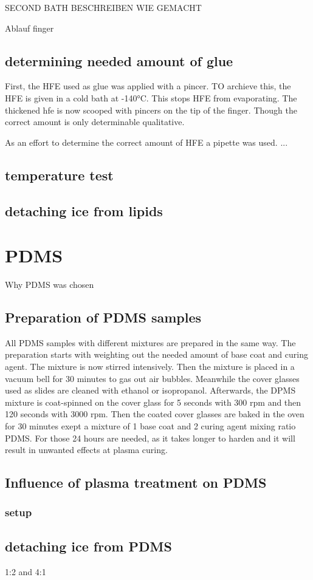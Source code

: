 SECOND BATH BESCHREIBEN WIE GEMACHT



Ablauf finger



\subsection{determining needed amount of glue}

First, the HFE used as glue was applied with a pincer. TO archieve this, the HFE is given in a cold bath at -140°C. This stops HFE from evaporating. The thickened hfe is now scooped with pincers on the tip of the finger. Though the correct amount is only determinable qualitative.

As an effort to determine the correct amount of HFE a pipette was used. ...



\subsection{temperature test}

\subsection{detaching ice from lipids}

\section{PDMS}

Why PDMS was chosen

\subsection{Preparation of PDMS samples}

All PDMS samples with different mixtures are prepared in the same way. The preparation starts with weighting out the needed amount of base coat and curing agent. The mixture is now stirred intensively. Then the mixture is placed in a vacuum bell for 30 minutes to gas out air bubbles. Meanwhile the cover glasses used as slides are cleaned with ethanol or isopropanol. Afterwards, the DPMS mixture is coat-spinned on the cover glass for 5 seconds with 300 rpm and then 120 seconds with 3000 rpm. Then the coated cover glasses are baked in the oven for 30 minutes exept a mixture of 1 base coat and 2 curing agent mixing ratio PDMS. For those 24 hours are needed, as it takes longer to harden and it will result in unwanted effects at plasma curing.

\subsection{Influence of plasma treatment on PDMS}

\subsubsection{setup}

\subsection{detaching ice from PDMS}

1:2 and 4:1

